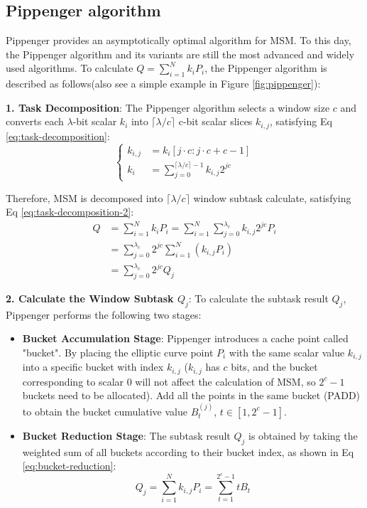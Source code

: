 \documentclass[conference]{IEEEtran}
\begin{document}
\subsection{Pippenger algorithm}
Pippenger provides an asymptotically optimal algorithm for MSM. To this day, the Pippenger algorithm and its variants are still the most advanced and widely used algorithms. To calculate $Q=\sum_{i=1}^N k_i P_i$, the Pippenger algorithm is described as follows(also see a simple example in Figure \ref{fig:pippenger}):

\textbf{1. Task Decomposition}: The Pippenger algorithm selects a window size $c$ and converts each $\lambda$-bit scalar $k_i$ into $\lceil \lambda / c \rceil$ c-bit scalar slices $k_{i,j}$, satisfying Eq \eqref{eq:task-decomposition}:
\begin{equation}
\label{eq:task-decomposition}
\left\{
\begin{aligned}
k_{i,j} &= k_i[j \cdot c : j \cdot c + c - 1] \\
k_i &= \sum_{j=0}^{\lceil \lambda / c \rceil - 1} k_{i,j} 2^{j c}
\end{aligned}
\right.
\end{equation}

Therefore, MSM is decomposed into $\lceil \lambda / c \rceil$ window subtask calculate, satisfying Eq \eqref{eq:task-decomposition-2}:
\begin{equation}
\begin{aligned}
\label{eq:task-decomposition-2}
Q &= \sum_{i=1}^N k_i P_i = \sum_{i=1}^N \sum_{j=0}^{\lambda_c} k_{i,j} 2^{j c} P_i \\
&= \sum_{j=0}^{\lambda_c} 2^{j c} \sum_{i=1}^N (k_{i,j} P_i) \\
&= \sum_{j=0}^{\lambda_c} 2^{j c} Q_j
\end{aligned}
\end{equation}

\textbf{2. Calculate the Window Subtask $Q_j$}: To calculate the subtask result $Q_j$, Pippenger performs the following two stages:
\begin{itemize}
\item \textbf{Bucket Accumulation Stage}: Pippenger introduces a cache point called "bucket". By placing the elliptic curve point $P_i$ with the same scalar value $k_{i,j}$ into a specific bucket with index $k_{i,j}$ ($k_{i,j}$ has $c$ bits, and the bucket corresponding to scalar 0 will not affect the calculation of MSM, so $2^c - 1$ buckets need to be allocated). Add all the points in the same bucket (PADD) to obtain the bucket cumulative value $B_t^{(j)}$, $t \in [1, 2^c - 1]$.
\item \textbf{Bucket Reduction Stage}: The subtask result $Q_j$ is obtained by taking the weighted sum of all buckets according to their bucket index, as shown in Eq \eqref{eq:bucket-reduction}:
\begin{equation}
\label{eq:bucket-reduction}
Q_j = \sum_{i=1}^N k_{i,j} P_i = \sum_{t=1}^{2^c - 1} t B_t
\end{equation}
\end{itemize}
\end{document}
